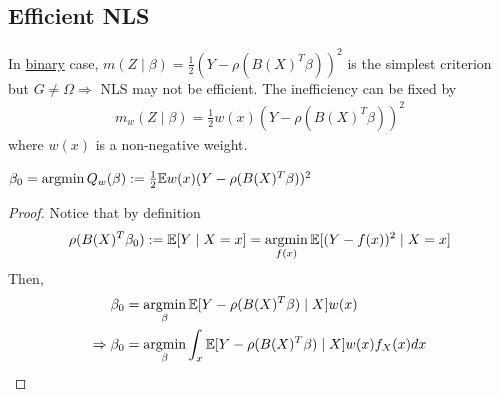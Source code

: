 \documentclass[11pt]{elegantbook}
\newcommand{\argmin}{\operatornamewithlimits{argmin}}
\begin{document}
\subsection{Efficient NLS}
In \underline{binary} case, $m(Z\mid\beta)=\frac{1}{2}(Y-\rho(B(X)^T\beta))^2$ is the simplest criterion but $G\neq \Omega \Rightarrow$ NLS may not be efficient. The inefficiency can be fixed by
\begin{equation}
    \begin{aligned}
        m_w(Z\mid\beta)=\frac{1}{2}w(x)(Y-\rho(B(X)^T\beta))^2
    \end{aligned}
    \nonumber
\end{equation}
where $w(x)$ is a non-negative weight.

\begin{claim}
    $\beta_0=\argmin Q_w(\beta):=\frac{1}{2}\mathbb{E}w(x)(Y-\rho(B(X)^T\beta))^2$
\end{claim}
\begin{proof}
    Notice that by definition
    \begin{equation}
        \begin{aligned}
            \rho(B(X)^T\beta_0):=\mathbb{E}[Y\mid X=x]=\argmin_{f(x)}\mathbb{E}[(Y-f(x))^2\mid X=x]
        \end{aligned}
        \nonumber
    \end{equation}
    Then,
    \begin{equation}
        \begin{aligned}
            \beta_0&=\argmin_{\beta}\mathbb{E}[Y-\rho(B(X)^T\beta)\mid X]w(x)\\
            \Rightarrow \beta_0&=\argmin_{\beta}\int_x\mathbb{E}[Y-\rho(B(X)^T\beta)\mid X]w(x)f_X(x)dx
        \end{aligned}
        \nonumber
    \end{equation}
\end{proof}
\end{document}
